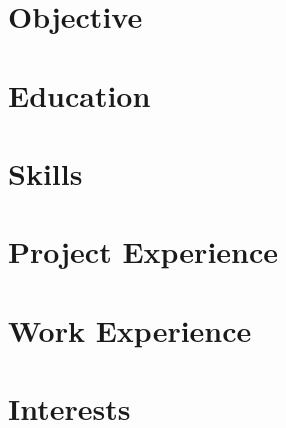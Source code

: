 \documentclass[letter,10pt]{article}
\begin{document}
\section{Objective}


\section{Education}


\section{Skills}


\section{Project Experience}


\section{Work Experience}




\section{Interests}

\end{document}
